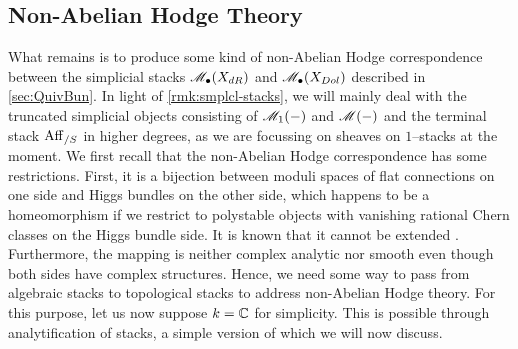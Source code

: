 \documentclass[11pt]{amsart}
\begin{document}
\subsection{Non-Abelian Hodge Theory}

What remains is to produce some kind of non-Abelian Hodge correspondence between
the simplicial stacks $\mathscr{M}_\bullet(X_{dR})$ and $\mathscr{M}_\bullet(X_{Dol})$
described in \cref{sec:QuivBun}. In light of \cref{rmk:smplcl-stacks},
we will mainly deal with the truncated simplicial objects consisting of
$\mathscr{M}_1(-)$ and $\mathscr{M}(-)$ and the terminal stack $\mathrm{Aff}_{/S}$ in higher degrees,
as we are focussing on sheaves on $1$--stacks at the moment.
We first recall that the non-Abelian Hodge correspondence has some
restrictions. First, it is a bijection between moduli spaces of flat
connections on one side and Higgs bundles on the other side, which happens to
be a homeomorphism if we restrict to polystable objects with vanishing
rational Chern classes on the Higgs bundle side. It is known that
it cannot be extended
\cite[Counterexample on pages 38---39]{ModRepFunGrpII}. Furthermore,
the mapping is neither complex analytic nor smooth even though both sides have
complex structures. Hence, we need some way to pass from algebraic stacks
to topological stacks to address non-Abelian Hodge theory.
For this purpose, let us now suppose $k = \mathbb{C}$ for simplicity.
This is possible through analytification of stacks, a simple version of which
we will now discuss.
\end{document}
